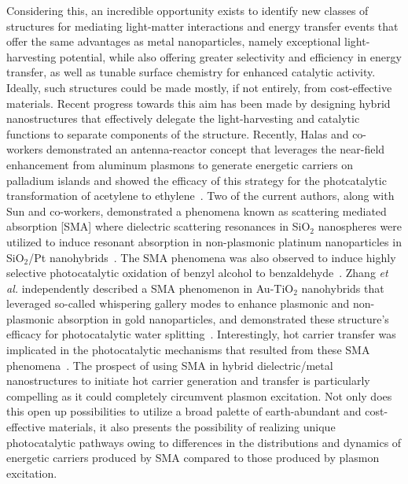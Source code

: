 \documentclass[journal=jpclcd,manuscript=article]{achemso}
\begin{document}
Considering this, an incredible opportunity exists to identify new classes of structures for mediating light-matter interactions and energy transfer events that offer the same advantages as metal nanoparticles, 
namely exceptional light-harvesting potential, while also offering greater selectivity and efficiency in energy transfer, as well as tunable surface chemistry for enhanced catalytic activity.  
Ideally, such structures could be made mostly, if not entirely, from cost-effective materials.  Recent progress towards this aim has been made by designing hybrid 
nanostructures that effectively delegate the light-harvesting and catalytic functions to separate components of the structure.  Recently, Halas and co-workers 
demonstrated an antenna-reactor concept that leverages the near-field enhancement from aluminum plasmons to generate energetic carriers on 
palladium islands and showed the efficacy of this strategy for the photcatalytic transformation of acetylene to ethylene~\cite{SZZ_PNAS_2016}.
Two of the current authors, along with Sun and co-workers, demonstrated a phenomena known as scattering mediated absorption [SMA] where dielectric
scattering resonances in SiO$_2$ nanospheres were utilized to induce resonant absorption in non-plasmonic platinum nanoparticles in SiO$_2$/Pt nanohybrids~\cite{ZHX_NatPhoton_2016}.
The SMA phenomena was also observed to induce highly selective photocatalytic oxidation of benzyl alcohol to benzaldehyde~\cite{ZHX_NatPhoton_2016}.
Zhang {\it et al.} independently described a SMA phenomenon in Au-TiO$_2$ nanohybrids that leveraged so-called whispering gallery modes to 
enhance plasmonic and non-plasmonic absorption in gold nanoparticles, and demonstrated these structure's efficacy for photocatalytic water splitting~\cite{ZJM_ACSNano_2016}.
Interestingly, hot carrier transfer was implicated in the photocatalytic mechanisms that resulted from these SMA phenomena~\cite{ZHX_NatPhoton_2016,ZJM_ACSNano_2016}.
The prospect of using SMA in hybrid dielectric/metal nanostructures to initiate hot carrier generation and transfer is particularly 
compelling as it could completely circumvent plasmon excitation.  Not only does this open up possibilities to utilize a broad palette of earth-abundant and cost-effective materials, it also
presents the possibility of realizing unique photocatalytic pathways owing to differences in the distributions and dynamics of energetic carriers produced by SMA compared
to those produced by plasmon excitation.    
\end{document}
